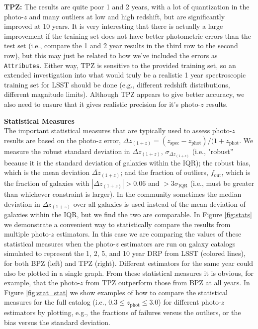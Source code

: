\documentclass[DM,lsstdraft,toc]{lsstdoc}
\begin{document}
\textbf{TPZ:} The results are quite poor 1 and 2 years, with a lot of quantization in the photo-$z$ and many outliers at low and high redshift, but are significantly improved at 10 years. It is very interesting that there is actually a large improvement if the training set does not have better photometric errors than the test set (i.e., compare the 1 and 2 year results in the third row to the second row), but this may just be related to how we've included the errors as \texttt{Attributes}. Either way, TPZ is sensitive to the provided training set, so an extended investigation into what would truly be a realistic 1 year spectroscopic training set for LSST should be done (e.g., different redshift distributions, different magnitude limits). Although TPZ appears to give better accuracy, we also need to ensure that it gives realistic precision for it's photo-$z$ results.

\smallskip \noindent \textbf{Statistical Measures} \\
The important statistical measures that are typically used to assess photo-$z$ results are based on the photo-$z$ error, $\Delta z_{(1+z)} = (z_\mathrm{spec}-z_\mathrm{phot})/(1+z_\mathrm{phot}$. We measure the robust standard deviation in $\Delta z_{(1+z)}$, $\sigma_{\Delta z_{(1+z)}}$ (i.e., "robust'' because it is the standard deviation of galaxies within the IQR); the robust bias, which is the mean deviation $\overline{\Delta z}_{(1+z)}$; and the fraction of outliers, $f_\mathrm{out}$, which is the fraction of galaxies with $|\Delta z_{(1+z)}|> 0.06$ and $>3\sigma_\mathrm{IQR}$ (i.e., must be greater than whichever constraint is larger). In the community sometimes the median deviation in $\Delta z_{(1+z)}$ over all galaxies is used instead of the mean deviation of galaxies within the IQR, but we find the two are comparable. In Figure \ref{fig:stats} we demonstrate a convenient way to statistically compare the results from multiple photo-$z$ estimators. In this case we are comparing the values of these statistical measures when the photo-$z$ estimators are run on galaxy catalogs simulated to represent the 1, 2, 5, and 10 year DRP from LSST (colored lines), for both BPZ (left) and TPZ (right). Different estimators for the same year could also be plotted in a single graph. From these statistical measures it is obvious, for example, that the photo-$z$ from TPZ outperform those from BPZ at all years. In Figure \ref{fig:stat_stat} we show examples of how to compare the statistical measures for the full catalog (i.e., $0.3 \leq z_\mathrm{phot} \leq 3.0$) for different photo-$z$ estimators by plotting, e.g., the fractions of failures versus the outliers, or the bias versus the standard deviation.
\end{document}
